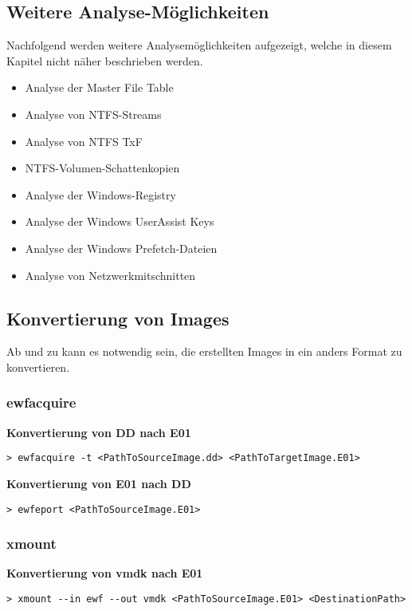 \subsection{Weitere Analyse-Möglichkeiten}
Nachfolgend werden weitere Analysemöglichkeiten aufgezeigt, welche in diesem Kapitel nicht näher beschrieben werden.
\begin{itemize}
\item Analyse der Master File Table
\item Analyse von NTFS-Streams
\item Analyse von NTFS TxF
\item NTFS-Volumen-Schattenkopien
\item Analyse der Windows-Registry
\item Analyse der Windows UserAssist Keys
\item Analyse der Windows Prefetch-Dateien
\item Analyse von Netzwerkmitschnitten
\end{itemize}

\subsection{Konvertierung von Images}
Ab und zu kann es notwendig sein, die erstellten Images in ein anders Format zu konvertieren. 

\subsubsection{ewfacquire}
\textbf{Konvertierung von DD nach E01}\\
\begin{lstlisting}
> ewfacquire -t <PathToSourceImage.dd> <PathToTargetImage.E01>
\end{lstlisting}

\textbf{Konvertierung von E01 nach DD}\\
\begin{lstlisting}
> ewfeport <PathToSourceImage.E01>
\end{lstlisting}

\subsubsection{xmount}
\textbf{Konvertierung von vmdk nach E01}\\
\begin{lstlisting}
> xmount --in ewf --out vmdk <PathToSourceImage.E01> <DestinationPath>
\end{lstlisting}

